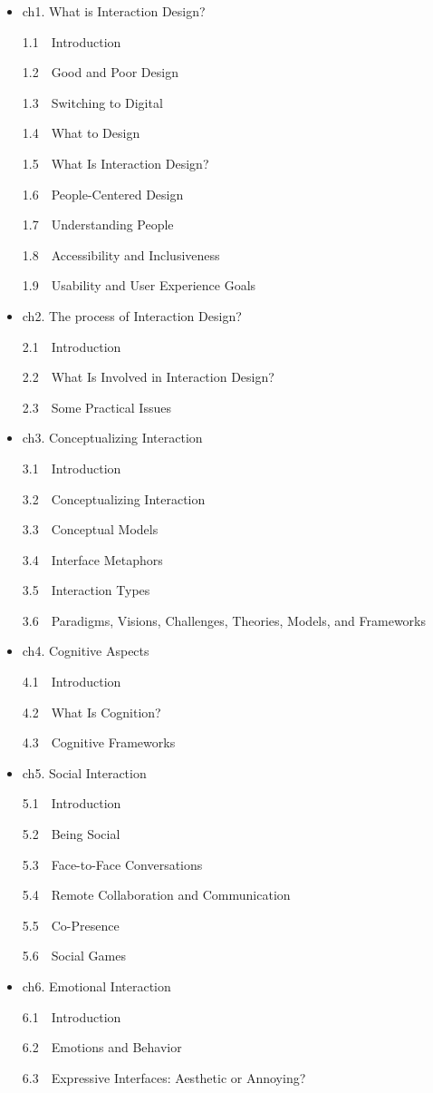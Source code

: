\documentclass[
  letterpaper,
  DIV=11,
  numbers=noendperiod]{scrreprt}
\begin{document}
\begin{itemize}
\item
  ch1. What is Interaction Design?

  1.1 Introduction

  1.2 Good and Poor Design

  1.3 Switching to Digital

  1.4 What to Design

  1.5 What Is Interaction Design?

  1.6 People-Centered Design

  1.7 Understanding People

  1.8 Accessibility and Inclusiveness

  1.9 Usability and User Experience Goals
\item
  ch2. The process of Interaction Design?

  2.1 Introduction

  2.2 What Is Involved in Interaction Design?

  2.3 Some Practical Issues
\item
  ch3. Conceptualizing Interaction

  3.1 Introduction

  3.2 Conceptualizing Interaction

  3.3 Conceptual Models

  3.4 Interface Metaphors

  3.5 Interaction Types

  3.6 Paradigms, Visions, Challenges, Theories, Models, and Frameworks
\item
  ch4. Cognitive Aspects

  4.1 Introduction

  4.2 What Is Cognition?

  4.3 Cognitive Frameworks
\item
  ch5. Social Interaction

  5.1 Introduction

  5.2 Being Social

  5.3 Face-to-Face Conversations

  5.4 Remote Collaboration and Communication

  5.5 Co-Presence

  5.6 Social Games
\item
  ch6. Emotional Interaction

  6.1 Introduction

  6.2 Emotions and Behavior

  6.3 Expressive Interfaces: Aesthetic or Annoying?


\end{itemize}
\end{document}

